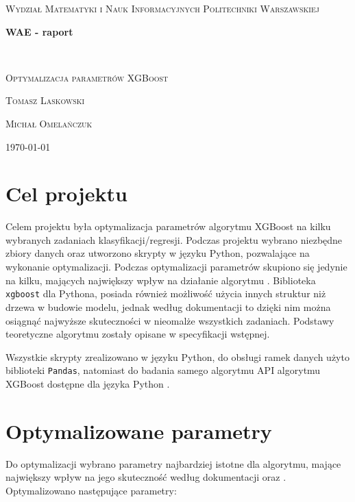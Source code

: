 \documentclass[a4paper,12p]{article}
\begin{document}
\thispagestyle{empty}
	\begin{center}
		{\scshape\Large Wydział Matematyki i Nauk Informacyjnych Politechniki Warszawskiej \par}
		\vspace{3cm}
		{\huge\bfseries WAE - raport\par}\
		\vspace{1cm}
		{\Large\scshape Optymalizacja parametrów XGBoost\par}
		\vspace{3cm}
		{\scshape Tomasz Laskowski\par}
		{\scshape Michał Omelańczuk\par}
		\vspace{8cm}
		{\Large \today}
		\vspace{1cm}
	\end{center}
	
	\newpage
	
	\section{Cel projektu}
	
	Celem projektu była optymalizacja parametrów algorytmu XGBoost na kilku wybranych zadaniach klasyfikacji/regresji. Podczas projektu wybrano niezbędne zbiory danych oraz utworzono skrypty w języku Python, pozwalające na wykonanie optymalizacji. Podczas optymalizacji parametrów skupiono się jedynie na kilku, mających największy wpływ na działanie algorytmu \cite{cs}. Biblioteka \texttt{xgboost} dla Pythona, posiada również możliwość użycia innych struktur niż drzewa w budowie modelu, jednak według dokumentacji to dzięki nim można osiągnąć najwyższe skuteczności w nieomalże wszystkich zadaniach. Podstawy teoretyczne algorytmu zostały opisane w specyfikacji wstępnej.
	
	Wszystkie skrypty zrealizowano w języku Python, do obsługi ramek danych użyto biblioteki \texttt{Pandas}, natomiast do badania samego algorytmu API algorytmu XGBoost dostępne dla języka Python \cite{docs}.
	
	\section{Optymalizowane parametry}	
	
	Do optymalizacji wybrano parametry najbardziej istotne dla algorytmu, mające największy wpływ na jego skuteczność według dokumentacji oraz \cite{cs}. Optymalizowano następujące parametry:
	
\end{document}
